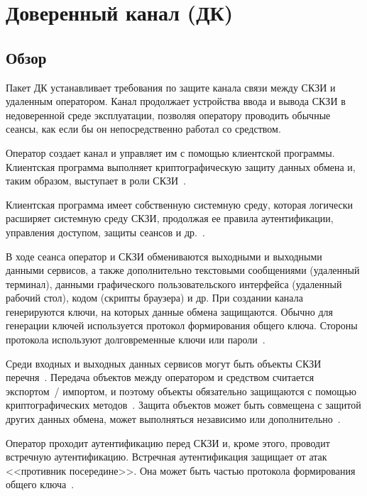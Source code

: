 \section{Доверенный канал (ДК)}\label{TC}

\subsection{Обзор}\label{TC.Intro}

Пакет ДК устанавливает требования по защите канала связи между СКЗИ и 
удаленным оператором. 
%
Канал продолжает устройства ввода и вывода СКЗИ в недоверенной среде 
эксплуатации, позволяя оператору проводить обычные сеансы,
как если бы он непосредственно работал со средством.

Оператор создает канал и управляет им с помощью клиентской программы. 
Клиентская программа выполняет криптографическую защиту данных обмена и, 
таким образом, выступает в роли СКЗИ~. 

Клиентская программа имеет собственную системную среду, которая логически 
расширяет системную среду СКЗИ, продолжая ее правила аутентификации,
управления доступом, защиты сеансов и др.~.

В ходе сеанса оператор и СКЗИ обмениваются выходными и выходными данными 
сервисов, а также дополнительно текстовыми сообщениями (удаленный терминал),  
данными графического пользовательского интерфейса (удаленный рабочий стол),
кодом (скрипты браузера) и др.
%
При создании канала генерируются ключи, на которых данные обмена защищаются. 
Обычно для генерации ключей используется протокол формирования общего 
ключа. Стороны протокола используют долговременные ключи или 
пароли~.

Среди входных и выходных данных сервисов могут быть объекты СКЗИ 
перечня~. Передача объектов между оператором и средством 
считается экспортом~/ импортом, и поэтому объекты обязательно защищаются с помощью 
криптографических методов~. Защита объектов 
может быть совмещена с защитой других данных обмена, может выполняться 
независимо или дополнительно~.

Оператор проходит аутентификацию перед СКЗИ и, кроме этого, проводит встречную 
аутентификацию. Встречная аутентификация защищает от атак <<противник 
посередине>>. Она может быть частью протокола формирования общего 
ключа~.

